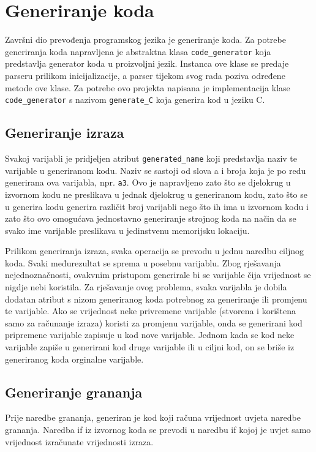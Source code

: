 \documentclass[times, utf8, zavrsni]{fer}
\begin{document}

\section{Generiranje koda}
Završni dio prevođenja programskog jezika je generiranje koda. Za potrebe generiranja koda napravljena je abstraktna klasa \verb|code_generator| koja predstavlja
generator koda u proizvoljni jezik. Instanca ove klase se predaje parseru prilikom inicijalizacije, a parser tijekom svog rada poziva određene metode ove klase.
Za potrebe ovo projekta napisana je implementacija klase \verb|code_generator| s nazivom \verb|generate_C| koja generira kod u jeziku C.

\subsection{Generiranje izraza}
Svakoj varijabli je pridjeljen atribut \verb|generated_name| koji predstavlja naziv te varijable u generiranom kodu. Naziv se sastoji od slova a i broja koja je 
po redu generirana ova varijabla, npr. \verb|a3|. Ovo je napravljeno zato što se djelokrug u izvornom kodu ne preslikava u jednak djelokrug u generiranom kodu,
zato što se u generira kodu generira različit broj varijabli nego što ih ima u izvornom kodu i zato što ovo omogućava jednostavno generiranje strojnog koda na 
način da se svako ime varijable preslikava u jedinstvenu memorijsku lokaciju.

Prilikom generiranja izraza, svaka operacija se prevodu u jednu naredbu ciljnog koda. Svaki međurezultat se sprema u posebnu varijablu. Zbog rješavanja nejednoznačnosti,
ovakvnim pristupom generirale bi se varijable čija vrijednost se nigdje nebi koristila. Za rješavanje ovog problema, svaka varijabla je dobila dodatan atribut s nizom 
generiranog koda potrebnog za generiranje ili promjenu te varijable. Ako se vrijednost neke privremene varijable (stvorena i korištena samo za računanje izraza) koristi
za promjenu varijable, onda se generirani kod pripremene varijable zapisuje u kod nove varijable. Jednom kada se kod neke varijable zapiše u generirani kod druge varijable
ili u ciljni kod, on se briše iz generiranog koda orginalne varijable.

\subsection{Generiranje grananja}
Prije naredbe grananja, generiran je kod koji računa vrijednost uvjeta naredbe grananja. Naredba if iz izvornog koda se prevodi u naredbu if kojoj je uvjet samo vrijednost
izračunate vrijednosti izraza.
\end{document}
